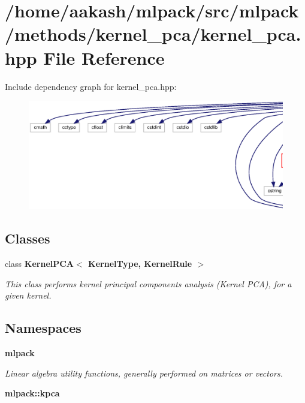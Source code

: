 \section{/home/aakash/mlpack/src/mlpack/methods/kernel\+\_\+pca/kernel\+\_\+pca.hpp File Reference}
\label{kernel__pca_8hpp}
Include dependency graph for kernel\+\_\+pca.\+hpp\+:
\nopagebreak
\begin{figure}[H]
\begin{center}
\leavevmode
\includegraphics[width=350pt]{kernel__pca_8hpp__incl}
\end{center}
\end{figure}
\subsection*{Classes}
\begin{DoxyCompactItemize}
\item 
class \textbf{ Kernel\+P\+C\+A$<$ Kernel\+Type, Kernel\+Rule $>$}
\begin{DoxyCompactList}\small\item\em This class performs kernel principal components analysis (Kernel P\+CA), for a given kernel. \end{DoxyCompactList}\end{DoxyCompactItemize}
\subsection*{Namespaces}
\begin{DoxyCompactItemize}
\item 
 \textbf{ mlpack}
\begin{DoxyCompactList}\small\item\em Linear algebra utility functions, generally performed on matrices or vectors. \end{DoxyCompactList}\item 
 \textbf{ mlpack\+::kpca}
\end{DoxyCompactItemize}


